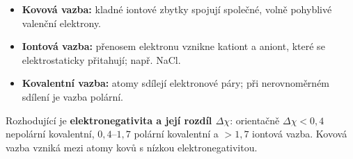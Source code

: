 \begin{itemize}
\item \textbf{Kovová vazba:} kladné iontové zbytky spojují společné, volně pohyblivé valenční elektrony.
\item \textbf{Iontová vazba:} přenosem elektronu vznikne kationt a aniont, které se elektrostaticky přitahují; např. NaCl.
\item \textbf{Kovalentní vazba:} atomy sdílejí elektronové páry; při nerovnoměrném sdílení je vazba polární.
\end{itemize}
Rozhodující je \textbf{elektronegativita a její rozdíl $\Delta\chi$}: orientačně $\Delta\chi<0{,}4$ nepolární kovalentní, $0{,}4$--$1{,}7$ polární kovalentní a $>1{,}7$ iontová vazba. Kovová vazba vzniká mezi atomy kovů s nízkou elektronegativitou.
